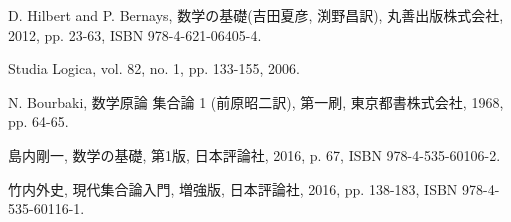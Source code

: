 \begin{thebibliography}{数字}
	 D. Hilbert and P. Bernays, 数学の基礎(吉田夏彦, 渕野昌訳), 丸善出版株式会社, 2012, pp. 23-63, ISBN 978-4-621-06405-4.
	
		Studia Logica, vol. 82, no. 1, pp. 133-155, 2006.
	
	
	 N. Bourbaki, 数学原論 集合論 1 (前原昭二訳), 第一刷, 東京都書株式会社, 1968, pp. 64-65.
	
	 島内剛一, 数学の基礎, 第1版, 日本評論社, 2016, p. 67, ISBN 978-4-535-60106-2.
	
	 竹内外史, 現代集合論入門, 増強版, 日本評論社, 2016, pp. 138-183, ISBN 978-4-535-60116-1.
	
	
	
	
	
	
	
	
\end{thebibliography}